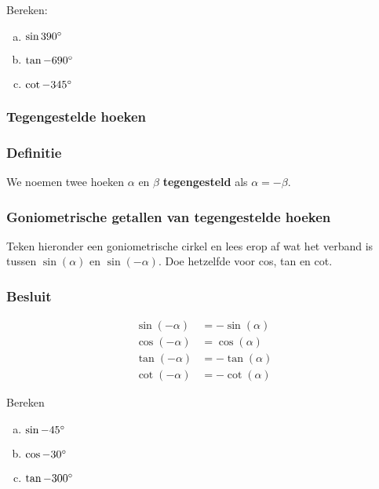\documentclass[a4paper,12pt]{article}
\begin{document}
\begin{oefening}
Bereken:
\begin{multicols}{3}
\begin{enumerate}[(a)]
  \item $\sin 390^\circ$
  \item $\tan -690^\circ$
  \item $\cot -345^\circ$
\end{enumerate}
\end{multicols}
\end{oefening}

\begin{theorie}

\pagebreak
\subsubsection{Tegengestelde hoeken}
\subsubsection*{Definitie}
We noemen twee hoeken $\alpha$ en $\beta$ \textbf{tegengesteld} als $\alpha=-\beta$.
\subsubsection*{Goniometrische getallen van tegengestelde hoeken}
Teken hieronder een goniometrische cirkel en lees erop af wat het verband is tussen $\sin(\alpha)$ en $\sin(-\alpha)$. Doe hetzelfde voor cos, tan en cot.
\vspace*{7cm}
\subsubsection*{Besluit}
\begin{align*}
  \sin(-\alpha)&=-\sin(\alpha)\\
  \cos(-\alpha)&=\cos(\alpha)\\
  \tan(-\alpha)&=-\tan(\alpha)\\
  \cot(-\alpha)&=-\cot(\alpha)
\end{align*}

\end{theorie}

\begin{oefening}
Bereken
\begin{multicols}{3}
\begin{enumerate}[(a)]
  \item $\sin-45^\circ$
  \item $\cos-30^\circ$
  \item $\tan-300^\circ$
\end{enumerate}
\end{multicols}
\end{oefening}
\end{document}
